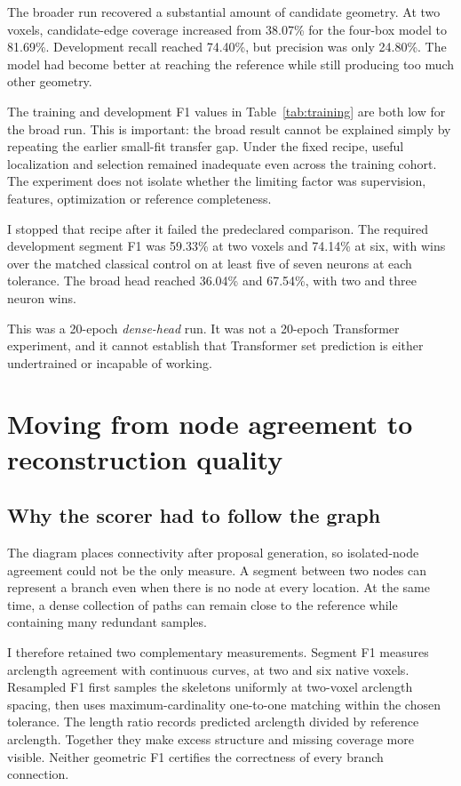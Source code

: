 \documentclass[11pt,a4paper]{article}
\newcommand{\evidence}[1]{~\cite{#1}}
\begin{document}
The broader run recovered a substantial amount of candidate geometry. At two voxels, candidate-edge coverage increased from 38.07\% for the four-box model to 81.69\%. Development recall reached 74.40\%, but precision was only 24.80\%. The model had become better at reaching the reference while still producing too much other geometry.\evidence{transfer,broad}

The training and development F1 values in Table~\ref{tab:training} are both low for the broad run. This is important: the broad result cannot be explained simply by repeating the earlier small-fit transfer gap. Under the fixed recipe, useful localization and selection remained inadequate even across the training cohort. The experiment does not isolate whether the limiting factor was supervision, features, optimization or reference completeness.

I stopped that recipe after it failed the predeclared comparison. The required development segment F1 was 59.33\% at two voxels and 74.14\% at six, with wins over the matched classical control on at least five of seven neurons at each tolerance. The broad head reached 36.04\% and 67.54\%, with two and three neuron wins.\evidence{broad}

This was a 20-epoch \emph{dense-head} run. It was not a 20-epoch Transformer experiment, and it cannot establish that Transformer set prediction is either undertrained or incapable of working.

\section{Moving from node agreement to reconstruction quality}
\subsection{Why the scorer had to follow the graph}
The diagram places connectivity after proposal generation, so isolated-node agreement could not be the only measure. A segment between two nodes can represent a branch even when there is no node at every location. At the same time, a dense collection of paths can remain close to the reference while containing many redundant samples.

I therefore retained two complementary measurements. Segment F1 measures arclength agreement with continuous curves, at two and six native voxels. Resampled F1 first samples the skeletons uniformly at two-voxel arclength spacing, then uses maximum-cardinality one-to-one matching within the chosen tolerance. The length ratio records predicted arclength divided by reference arclength. Together they make excess structure and missing coverage more visible. Neither geometric F1 certifies the correctness of every branch connection.\evidence{formulation,compact}
\end{document}
